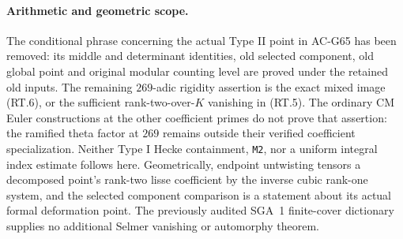 \paragraph{Arithmetic and geometric scope.}
The conditional phrase concerning the actual Type II
point in AC-G65 has been removed: its middle and
determinant identities, old selected component,
old global point and original modular counting level
are proved under the retained old inputs.
The remaining \(269\)-adic rigidity assertion is
the exact mixed image (RT.6), or the sufficient
rank-two-over-\(K\) vanishing in (RT.5).
The ordinary CM Euler constructions at the other
coefficient primes do not prove that assertion:
the ramified theta factor at \(269\) remains outside
their verified coefficient specialization.
Neither Type I Hecke containment, \texttt{M2}, nor
a uniform integral index estimate follows here.
Geometrically, endpoint untwisting tensors a
decomposed point's rank-two lisse coefficient by
the inverse cubic rank-one system, and the selected
component comparison is a statement about its
actual formal deformation point. The previously
audited SGA~1 finite-cover dictionary supplies no
additional Selmer vanishing or automorphy theorem.
